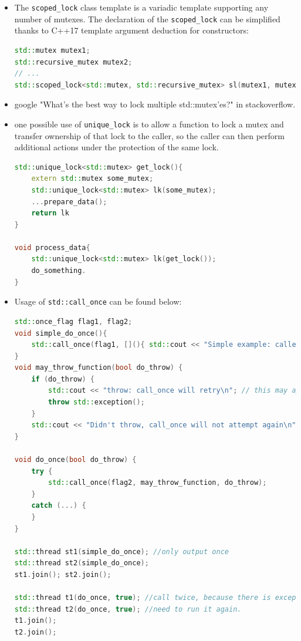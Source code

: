 \documentclass[a4paper,11pt,twoside]{book}
\begin{document}
\begin{itemize}
	
	\item The \texttt{scoped\_lock} class template is a variadic template supporting any number of mutexes. The declaration of the \texttt{scoped\_lock} can be simplified thanks to C++17 template argument deduction for constructors:
\begin{lstlisting}[frame=single, language=c++]	
std::mutex mutex1;
std::recursive_mutex mutex2;
// ...
std::scoped_lock<std::mutex, std::recursive_mutex> sl(mutex1, mutex2);
\end{lstlisting}	
	

    \item google "What's the best way to lock multiple std::mutex'es?" in stackoverflow. 

    \item one possible use of \texttt{unique\_lock} is to allow a function to lock a mutex and transfer ownership of that lock to the caller, so the caller can then perform additional actions under the protection of the same lock. 

\begin{lstlisting}[frame=single, language=c++]	
std::unique_lock<std::mutex> get_lock(){
	extern std::mutex some_mutex;
	std::unique_lock<std::mutex> lk(some_mutex);
	...prepare_data();
	return lk
}

void process_data{
	std::unique_lock<std::mutex> lk(get_lock());
	do_something.
}
\end{lstlisting}

    \item Usage of \texttt{std::call\_once} can be found below:

\begin{lstlisting}[frame=single, language=c++]	
std::once_flag flag1, flag2;
void simple_do_once(){
	std::call_once(flag1, [](){ std::cout << "Simple example: called once\n"; });
}
void may_throw_function(bool do_throw) {
	if (do_throw) {
		std::cout << "throw: call_once will retry\n"; // this may appear more than once
		throw std::exception();
	}
	std::cout << "Didn't throw, call_once will not attempt again\n"; // guaranteed once
}

void do_once(bool do_throw) {
	try {
		std::call_once(flag2, may_throw_function, do_throw);
	}
	catch (...) {
	}
}

std::thread st1(simple_do_once); //only output once
std::thread st2(simple_do_once);
st1.join(); st2.join();

std::thread t1(do_once, true); //call twice, because there is exception.
std::thread t2(do_once, true); //need to run it again. 
t1.join();
t2.join();
\end{lstlisting}
\end{itemize}
\end{document}
